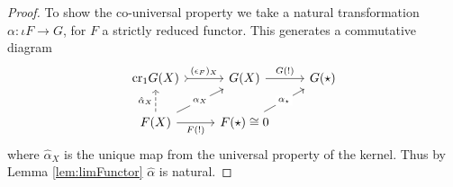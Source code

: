 \begin{proof}
    To show the co-universal property we take a natural transformation $\alpha:\iota F\rightarrow G$, for $F$ a strictly reduced functor. This generates a commutative diagram
    \[\begin{tikzcd}
	{\text{cr}_1G(X)} & {G(X)} & {G(\star)} \\
	{F(X)} & {F(\star)\cong 0}
	\arrow["{(\epsilon_F)_X}", tail, from=1-1, to=1-2]
	\arrow["{G(!)}", from=1-2, to=1-3]
	\arrow["{\alpha_X}"{description}, from=2-1, to=1-2]
	\arrow["{F(!)}"', from=2-1, to=2-2]
	\arrow["{\alpha_\star}"{description}, from=2-2, to=1-3]
	\arrow["{\hat{\alpha}_X}", dashed, from=2-1, to=1-1]
\end{tikzcd}\]
    where $\hat{\alpha}_X$ is the unique map from the universal property of the kernel. Thus by Lemma \ref{lem:limFunctor} $\hat{\alpha}$ is natural.

\end{proof}
